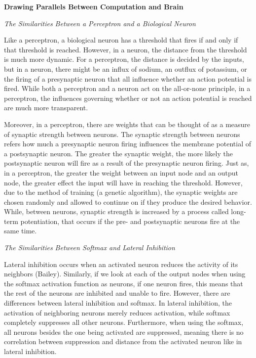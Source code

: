\documentclass[12pt]{article}
\begin{document}
\begin{flushleft}
\noindent\textbf{Drawing Parallels Between Computation and Brain}

\noindent\emph{The Similarities Between a Perceptron and a Biological Neuron}

Like a perceptron, a biological neuron has a threshold that fires if and only if that threshold is reached. However, in a neuron, the distance from the threshold is much more dynamic. For a perceptron, the distance is decided by the inputs, but in a neuron, there might be an influx of sodium, an outflux of potassium, or the firing of a presynaptic neuron that all influence whether an action potential is fired. While both a perceptron and a neuron act on the all-or-none principle, in a perceptron, the influences governing whether or not an action potential is reached are much more transparent. 

Moreover, in a perceptron, there are weights that can be thought of as a measure of synaptic strength between neurons. The synaptic strength between neurons refers how much a presynaptic neuron firing influences the membrane potential of a postsynaptic neuron. The greater the synaptic weight, the more likely the postsynaptic neuron will fire as a result of the presynaptic neuron firing. Just as, in a perceptron, the greater the weight between an input node and an output node, the greater effect the input will have in reaching the threshold. However, due to the method of training (a genetic algorithm), the synaptic weights are chosen randomly and allowed to continue on if they produce the desired behavior. While, between neurons, synaptic strength is increased by a process called long-term potentiation, that occurs if the pre- and postsynaptic neurons fire at the same time.

\hfill

\noindent\emph{The Similarities Between Softmax and Lateral Inhibition}

Lateral inhibition occurs when an activated neuron reduces the activity of its neighbors (Bailey). Similarly, if we look at each of the output nodes when using the softmax activation function as neurons, if one neuron fires, this means that the rest of the neurons are inhibited and unable to fire. However, there are differences between lateral inhibition and softmax. In lateral inhibition, the activation of neighboring neurons merely reduces activation, while softmax completely suppresses all other neurons. Furthermore, when using the softmax, all neurons besides the one being activated are suppressed, meaning there is no correlation between suppression and distance from the activated neuron like in lateral inhibition. 


\end{flushleft}
\end{document}

